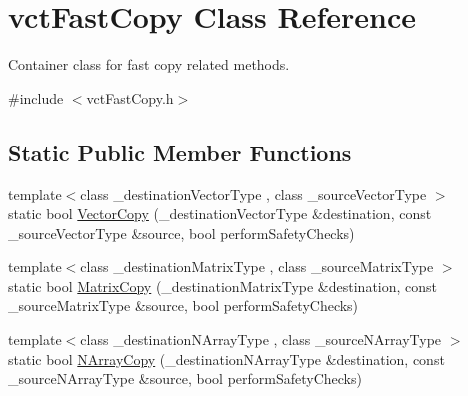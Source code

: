 \hypertarget{classvct_fast_copy}{}\section{vct\+Fast\+Copy Class Reference}
\label{classvct_fast_copy}


Container class for fast copy related methods.  




{\ttfamily \#include $<$vct\+Fast\+Copy.\+h$>$}

\subsection*{Static Public Member Functions}
\begin{DoxyCompactItemize}
\item 
{\footnotesize template$<$class \+\_\+destination\+Vector\+Type , class \+\_\+source\+Vector\+Type $>$ }\\static bool \hyperlink{classvct_fast_copy_aacb33101a27b7973d2f481d4f7715d12}{Vector\+Copy} (\+\_\+destination\+Vector\+Type \&destination, const \+\_\+source\+Vector\+Type \&source, bool perform\+Safety\+Checks)
\item 
{\footnotesize template$<$class \+\_\+destination\+Matrix\+Type , class \+\_\+source\+Matrix\+Type $>$ }\\static bool \hyperlink{classvct_fast_copy_ad56179d475fbc94f78dd84a22c4be580}{Matrix\+Copy} (\+\_\+destination\+Matrix\+Type \&destination, const \+\_\+source\+Matrix\+Type \&source, bool perform\+Safety\+Checks)
\item 
{\footnotesize template$<$class \+\_\+destination\+N\+Array\+Type , class \+\_\+source\+N\+Array\+Type $>$ }\\static bool \hyperlink{classvct_fast_copy_a97dd2f0d94e538ba59937186bc3cf8d0}{N\+Array\+Copy} (\+\_\+destination\+N\+Array\+Type \&destination, const \+\_\+source\+N\+Array\+Type \&source, bool perform\+Safety\+Checks)
\end{DoxyCompactItemize}
{\bf }\par
